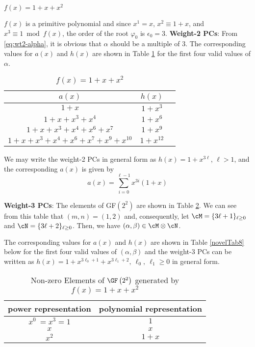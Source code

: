 \begin{example}$f(x)=1+x+x^2$

$f(x)$ is a primitive polynomial and since $x^1=x$, $x^2 \equiv 1+x$, and $x^3 \equiv 1 \bmod f(x)$, the order of the root $\varphi_0$ is $\epsilon_0=3$.\newline
\textbf{Weight-2 PCs}: 
 From \eqref{eq:wt2-alpha}, it is obvious that $\alpha$ should be a multiple of $3$. The corresponding values for $a(x)$ and $h(x)$ are shown in Table \ref{novelTab2} for the first four valid values of $\alpha$.
\begin{table}[htbp]
 \caption{$f(x)=1+x+x^2$}
\centering
 \begin{tabular}{c c c} 
 $a(x)$ & $h(x)$ \\ [0.5ex] 
 \hline\hline
$1+x$
 & $1+x^{3}$ \\
\hline
$1+x+x^3+x^4$
 & $1+x^{6}$ 
 \\
\hline
$1+x+x^3+x^4+x^6+x^{7}$ 
&  $1+x^{9}$ 
\\
\hline
$1+x+x^3+x^4+x^6+x^{7}+x^9+x^{10}$
 &  $1+x^{12}$ \\
 \end{tabular}
 \label{novelTab2}
\end{table}
We may write the weight-2 PCs in general form as $h(x)=1+x^{3\ell}$, $\ell>1$, and the corresponding $a(x)$ is given by 
\begin{equation*}
a(x)=\sum_{i=0}^{\ell-1} x^{3i}(1+x)
\end{equation*}

\textbf{Weight-3 PCs}: The elements of GF$(2^2)$ are shown in Table \ref{novelTab7}.  We can see from this table that $(m,n)= (1,2)$ and, consequently, let $\cM = \{3\ell+1\}_{\ell\geq 0}$ and $\cN = \{3\ell+2\}_{\ell\geq 0}$. Then, we have $(\alpha,\beta) \in \cM\otimes\cN$.  

The corresponding values for $a(x)$ and $h(x)$ are shown in Table \ref{novelTab8} below for the first four valid values of $(\alpha,\beta)$ and the weight-3 PCs can be written as $h(x)=1+x^{3\ell_0+1}+x^{3\ell_1+2},~\ell_0,~\ell_1 \geq 0$
in general form. 
 \begin{table}[htbp]
 \caption{Non-zero Elements of $\GF \left(2^2\right)$ generated by $f(x)=1+x+x^2$}
\centering
 \begin{tabular}{c c} 
 \hline
 power representation & polynomial representation \\ [0.5ex] 
 \hline\hline
$x^0~=x^3=1$ & $1$\\
\hline
$x$ & $x$\\
\hline
$x^2$ &  $1+x$\\
\hline
 \end{tabular}
 \label{novelTab7}
\end{table}


\end{example}
